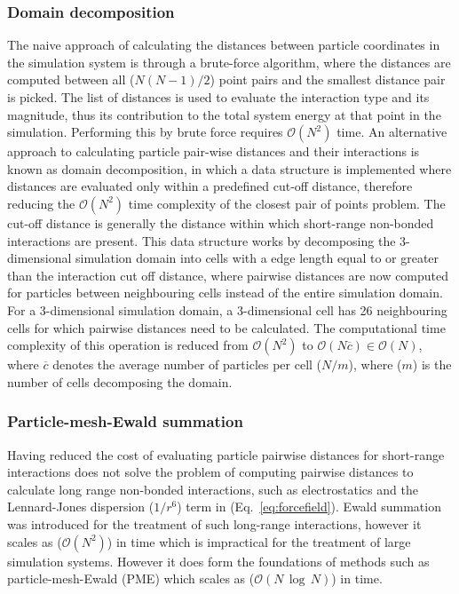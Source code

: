 \subsubsection{Domain decomposition}
The naive approach of calculating the distances between particle coordinates in the simulation system is through a brute-force algorithm, where the distances are computed between all ($N(N-1)/2$) point pairs and the smallest distance pair is picked. The list of distances is used to evaluate the interaction type and its magnitude, thus its contribution to the total system energy at that point in the simulation. Performing this by brute force requires $\mathcal{O} (N^2)$ time. An alternative approach to calculating particle pair-wise distances and their interactions is known as domain decomposition, in which a data structure is implemented where distances are evaluated only within a predefined cut-off distance, therefore reducing the $\mathcal{O} (N^2)$ time complexity of the closest pair of points problem. The cut-off distance is generally the distance within which short-range non-bonded interactions are present. This data structure works by decomposing the 3-dimensional simulation domain into cells with a edge length equal to or greater than the interaction cut off distance, where pairwise distances are now computed for particles between neighbouring cells instead of the entire simulation domain. For a 3-dimensional simulation domain, a 3-dimensional cell has 26 neighbouring cells for which pairwise distances need to be calculated. The computational time complexity of this operation is reduced from $\mathcal{O} (N^2)$ to $\mathcal{O} (N\overline{c}) \in \mathcal{O} (N)$, where $\overline{c}$ denotes the average number of particles per cell ($N/m$), where ($m$) is the number of cells decomposing the domain. 

\subsubsection{Particle-mesh-Ewald summation} \label{sec:pme}
Having reduced the cost of evaluating particle pairwise distances for short-range interactions does not solve the problem of computing pairwise distances to calculate long range non-bonded interactions, such as electrostatics and the Lennard-Jones dispersion ($1/r^6$) term in (Eq.~\ref{eq:forcefield}). Ewald summation \cite{ewald1921berechnung} was introduced for the treatment of such long-range interactions, however it scales as ($\mathcal{O}(N^2)$) in time which is impractical for the treatment of large simulation systems. However it does form the foundations of methods such as particle-mesh-Ewald (PME) \cite{Darden1993} which scales as ($\mathcal{O}(N\,\log\,N)$) in time.

